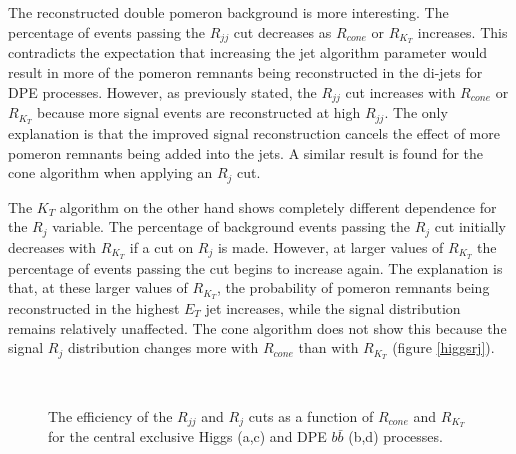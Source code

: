 
The reconstructed double pomeron background is more interesting. The percentage of events passing the $R_{jj}$ cut decreases as $R_{cone}$ or $R_{K_T}$ increases. This contradicts the expectation that increasing the jet algorithm parameter would result in more of the pomeron remnants being reconstructed in the di-jets for DPE processes.
However, as previously stated, the $R_{jj}$ cut increases with $R_{cone}$ or $R_{K_T}$ because more signal events are reconstructed at high $R_{jj}$. The only explanation is that the improved signal reconstruction cancels the effect of more pomeron remnants being added into the jets. A similar result is found for the cone algorithm when applying an $R_{j}$ cut.

The $K_{T}$ algorithm on the other hand shows completely different dependence for the $R_j$ variable. The percentage of background events passing the $R_j$ cut initially decreases with $R_{K_T}$ if a cut on $R_{j}$ is made. However, at larger values of $R_{K_T}$ the percentage of events passing the cut begins to increase again. The explanation is that, at these larger values of $R_{K_T}$, the probability of pomeron remnants being reconstructed in the highest $E_T$ jet increases, while the signal distribution remains relatively unaffected. The cone algorithm does not show this because the signal $R_j$ distribution changes more with $R_{cone}$ than with $R_{K_T}$ (figure \ref{higgsrj}). 

\begin{figure} 
\centering
\mbox{
	\quad
	}
	\mbox{
	\quad
}
\caption[The efficiency of the $R_{jj}$ and $R_{j}$ cuts as a function of $R_{cone}$ and $R_{K_T}$]{The efficiency of the $R_{jj}$ and $R_{j}$ cuts as a function of $R_{cone}$ and $R_{K_T}$ for the central exclusive Higgs (a,c) and DPE $b\bar{b}$ (b,d) processes.\label{dijetmasscutefficiency}}
\end{figure}

